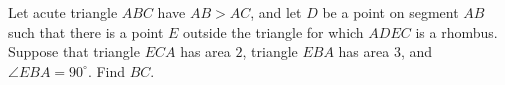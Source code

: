Let acute triangle $ABC$ have $AB>AC$, and let $D$ be a point on segment $AB$ such that there is a point $E$ outside the triangle for which $ADEC$ is a rhombus. Suppose that triangle $ECA$ has area $2$, triangle $EBA$ has area $3$, and $\angle EBA=90^\circ$. Find $BC$.
